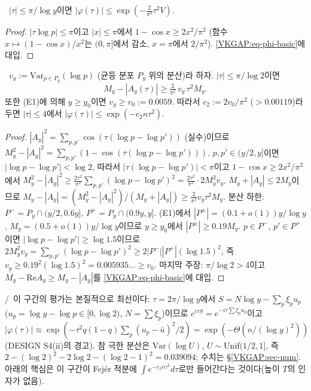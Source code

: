 \begin{lemma}[원점 근방]\label{VKGAP:lem-phi1}
\PROVED\ $|\tau|\le\pi/\log y$이면 $|\varphi(\tau)|\le\exp(-\tfrac{2}{\pi^2}\tau^2V)$.
\end{lemma}
\begin{proof}
$|\tau\log p|\le\pi$이고 $|x|\le\pi$에서 $1-\cos x\ge 2x^2/\pi^2$ (함수 $x\mapsto (1-\cos x)/x^2$는 $(0,\pi]$에서 감소, $x=\pi$에서 $2/\pi^2$).
\eqref{VKGAP:eq-phi-basic}에 대입.
\end{proof}

\begin{lemma}[쌍 논법: 격자 공명 구간]\label{VKGAP:lem-pair}
\PROVED\ $v_y:=\mathrm{Var}_{p\in P_y}(\log p)$ (균등 분포 $P_y$ 위의 분산)라 하자. $|\tau|\le\pi/\log2$이면
\[
M_y-|A_y(\tau)|\ge \tfrac{2}{\pi^2}\,v_y\,\tau^2M_y .
\]
또한 (E1)에 의해 $y\ge y_0$이면 $v_y\ge v_0:=0.0059$. 따라서 $c_2:=2v_0/\pi^2$ ($>0.00119$)라 두면
$|\tau|\le4$에서 $|\varphi(\tau)|\le\exp(-c_2n\tau^2)$.
\end{lemma}
\begin{proof}
$|A_y|^2=\sum_{p,p'}\cos(\tau(\log p-\log p'))$ (실수)이므로
$M_y^2-|A_y|^2=\sum_{p,p'}(1-\cos(\tau(\log p-\log p')))$.
$p,p'\in(y/2,y]$이면 $|\log p-\log p'|<\log2$, 따라서 $|\tau(\log p-\log p')|<\pi$이고
$1-\cos x\ge2x^2/\pi^2$에서
$M_y^2-|A_y|^2\ge\frac{2\tau^2}{\pi^2}\sum_{p,p'}(\log p-\log p')^2=\frac{2\tau^2}{\pi^2}\cdot 2M_y^2v_y$.
$M_y+|A_y|\le 2M_y$이므로 $M_y-|A_y|=(M_y^2-|A_y|^2)/(M_y+|A_y|)\ge \frac{2}{\pi^2}v_y\tau^2M_y$.
분산 하한: $P^-=P_y\cap(y/2,0.6y]$, $P^+=P_y\cap(0.9y,y]$. (E1)에서 $|P^\pm|=(0.1+o(1))y/\log y$,
$M_y=(0.5+o(1))y/\log y$이므로 $y\ge y_0$에서 $|P^\pm|\ge0.19M_y$.
$p\in P^-$, $p'\in P^+$이면 $|\log p-\log p'|\ge\log1.5$이므로
$2M_y^2v_y=\sum_{p,p'}(\log p-\log p')^2\ge 2|P^-||P^+|(\log1.5)^2$, 즉
$v_y\ge 0.19^2(\log 1.5)^2=0.005935\ldots\ge v_0$.
마지막 주장: $\pi/\log2>4$이고 $M_y-\mathrm{Re}A_y\ge M_y-|A_y|$를 \eqref{VKGAP:eq-phi-basic}에 대입.
\end{proof}

\begin{remark}\label{VKGAP:rem-lattice}
\HEUR/\NUMERIC\ 이 구간의 평가는 본질적으로 최선이다: $\tau=2\pi/\log y$에서
$S=N\log y-\sum_p\xi_pu_p$ ($u_p=\log y-\log p\in[0,\log2)$, $N=\sum\xi_p$)이므로 $e^{i\tau S}=e^{-i\tau\sum\xi_pu_p}$이고
$|\varphi(\tau)|\approx\exp(-\tau^2 q(1-q)\sum_p (u_p-\bar u)^2/2)=\exp(-\Theta(n/(\log y)^2))$ (DESIGN S4(ii)의 경고).
참 극한 분산은 $\mathrm{Var}(\log U)$, $U\sim\mathrm{Unif}(1/2,1]$, 즉 $2-(\log2)^2-2\log2-(\log2-1)^2=0.039094$;
수치는 \S\ref{VKGAP:sec-num}.
아래의 핵심은 이 구간이 Fejér 적분에 $\int e^{-c_2n\tau^2}d\tau$로만 들어간다는 것이다(높이 $T$의 인자가 없음).
\end{remark}

